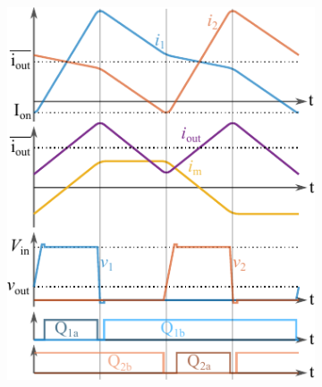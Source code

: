 \documentclass{IPEC2026}
\begin{document}
\begin{figure}
  \begin{subfigure}[c]{0.51\columnwidth}
      \centering
      \includegraphics[width=\textwidth]{figures/Inkscape/Waveforms_negative.pdf}
      \label{fig:waveform_negCoupling}
    \end{subfigure}
    \begin{subfigure}[c]{0.48\columnwidth}
      \centering

\end{subfigure}
\end{figure}
\end{document}
